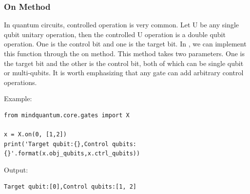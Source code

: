\subsubsection{On Method}
In quantum circuits, controlled operation is very common. Let U be any single qubit unitary operation, then the controlled U operation is a double qubit operation. One is the control bit and one is the target bit. In \MindQuantum, we can implement this function through the on method. This method takes two parameters. One is the target bit and the other is the control bit, both of which can be single qubit or multi-qubits. It is worth emphasizing that any gate can add arbitrary control operations.

Example:
\begin{lstlisting}
from mindquantum.core.gates import X

x = X.on(0, [1,2])
print('Target qubit:{},Control qubits:{}'.format(x.obj_qubits,x.ctrl_qubits))
\end{lstlisting}
Output:
\begin{lstlisting}
Target qubit:[0],Control qubits:[1, 2]
\end{lstlisting}


